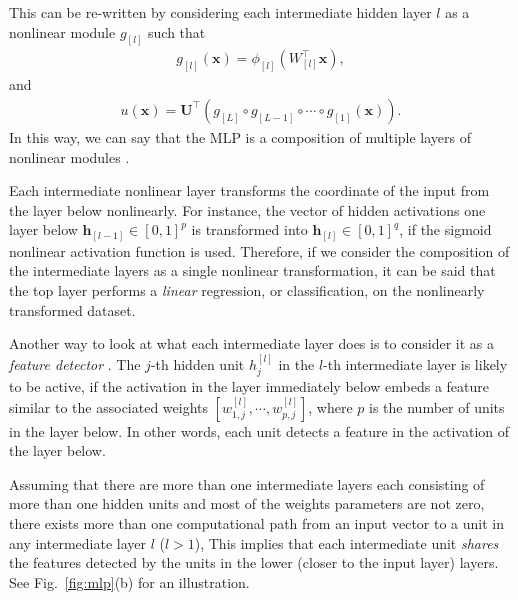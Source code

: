 \documentclass[dissertation,nocontribution]{aaltoseries}
\newcommand{\qlay}[1]{\left[#1\right]}
\newcommand{\vect}[1]{\mathbf{#1}}
\newcommand{\matr}[1]{\mathbf{#1}}
\newcommand{\vh}[0]{\vect{h}}
\newcommand{\vx}[0]{\vect{x}}
\newcommand{\mU}[0]{\matr{U}}
\begin{document}
This can be re-written by considering each intermediate
hidden layer $l$ as a nonlinear module $g_{\qlay{l}}$ such that
\begin{align*}
    g_{\qlay{l}}(\vx) = \phi_{\qlay{l}}(W_{\qlay{l}}^\top \vx),
\end{align*}
and
\begin{align*}
    u(\vx) = \mU^\top 
    \left(g_{\qlay{L}} \circ g_{\qlay{L-1}} \circ \cdots
    \circ g_{\qlay{1}} (\vx) \right).
\end{align*}
In this way, we can say that the MLP is a composition of
multiple layers of nonlinear modules \citep{Bengio2007a}.

Each intermediate nonlinear layer transforms the coordinate
of the input from the layer below nonlinearly. For instance,
the vector of hidden activations one layer below
$\vh_{\qlay{l-1}} \in \left[ 0, 1\right]^p$ is transformed into
$\vh_{\qlay{l}} \in \left[0, 1\right]^q$, if the sigmoid nonlinear
activation function is used. Therefore, if we consider the
composition of the intermediate layers as a single nonlinear
transformation, it can be said that the top layer performs a
\textit{linear} regression, or classification, on the
nonlinearly transformed dataset. 

Another way to look at what each intermediate layer does is
to consider it as a \textit{feature detector} \citep[see,
e.g.,][]{Haykin2009}. The $j$-th hidden unit $h_j^{\qlay{l}}$ in
the $l$-th intermediate layer is likely to be active, if the
activation in the layer immediately below embeds a feature
similar to the associated weights $\left[ w_{1,j}^{\qlay{l}},
\cdots, w_{p,j}^{\qlay{l}} \right]$, where $p$ is the number of
units in the layer below. In other words, each unit detects
a feature in the activation of the layer below.

Assuming that there are more than one intermediate layers each
consisting of more than one hidden units and most of the weights
parameters are not zero, there exists more than one computational
path from an input vector to a unit in any intermediate layer $l$
($l > 1$),  This implies that each intermediate unit
\textit{shares} the features detected by the units in the lower
(closer to the input layer) layers.  See Fig.~\ref{fig:mlp}(b)
    for an illustration.
\end{document}
